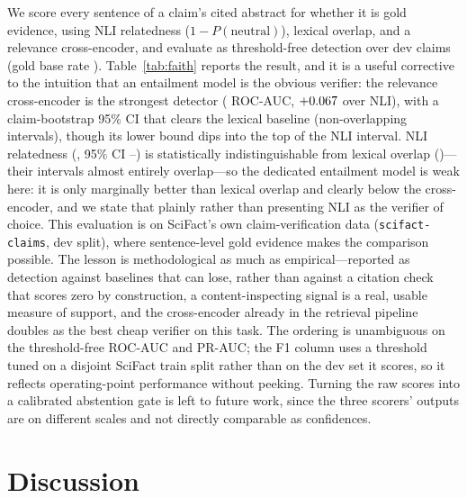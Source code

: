 \documentclass[11pt]{article}
\begin{document}
We score every sentence of a claim's cited abstract for whether it is gold
evidence, using NLI relatedness ($1-P(\text{neutral})$), lexical overlap, and a
relevance cross-encoder, and evaluate as threshold-free detection over
\FaithClaims{} dev claims (gold base rate \FaithBaseRate{}).
Table~\ref{tab:faith} reports the result, and it is a useful corrective to the
intuition that an entailment model is the obvious verifier: the relevance
cross-encoder is the strongest detector (\FaithCeAuroc{} ROC-AUC,
$+0.067{}$ over NLI), with a claim-bootstrap 95\% CI that clears the
lexical baseline (non-overlapping intervals), though its lower bound dips into
the top of the NLI interval. NLI relatedness (\FaithNliAuroc{}, 95\% CI
\FaithNliAurocLo{}--\FaithNliAurocHi{}) is statistically indistinguishable from
lexical overlap (\FaithLexAuroc{})---their intervals almost entirely
overlap---so the dedicated entailment model is weak here: it is only marginally
better than lexical overlap and clearly below the cross-encoder, and we state
that plainly rather than presenting NLI as the verifier of choice. This
evaluation is on SciFact's own claim-verification data
(\texttt{scifact-claims}, dev split), where sentence-level gold evidence makes
the comparison possible.
The lesson is methodological as much as empirical---reported
as detection against baselines that can lose, rather than against a citation
check that scores zero by construction, a content-inspecting signal is a real,
usable measure of support, and the cross-encoder already in the retrieval
pipeline doubles as the best cheap verifier on this task. The ordering is unambiguous on the
threshold-free ROC-AUC and PR-AUC; the F1 column uses a threshold tuned on a
disjoint SciFact train split rather than on the dev set it scores, so it reflects
operating-point performance without peeking. Turning the raw scores into a
calibrated abstention gate is left to future work, since the three scorers'
outputs are on different scales and not directly comparable as confidences.

\begin{table}[t]
\centering
\caption{Evidence-sentence detection on SciFact dev. ROC-AUC (with a
claim-bootstrap 95\% CI) and PR-AUC are threshold-free; F1 is at a threshold
tuned on a disjoint train split. Best in bold.}
\label{tab:faith}
\small

\end{table}

\section{Discussion}
\end{document}
